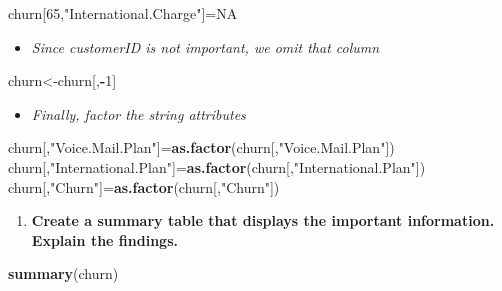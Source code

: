 \documentclass[]{article}
\newenvironment{Shaded}{\begin{snugshade}}{\end{snugshade}}
\newcommand{\DecValTok}[1]{\textcolor[rgb]{0.00,0.00,0.81}{#1}}
\newcommand{\KeywordTok}[1]{\textcolor[rgb]{0.13,0.29,0.53}{\textbf{#1}}}
\newcommand{\NormalTok}[1]{#1}
\newcommand{\OperatorTok}[1]{\textcolor[rgb]{0.81,0.36,0.00}{\textbf{#1}}}
\newcommand{\OtherTok}[1]{\textcolor[rgb]{0.56,0.35,0.01}{#1}}
\newcommand{\StringTok}[1]{\textcolor[rgb]{0.31,0.60,0.02}{#1}}
\providecommand{\tightlist}{%
  \setlength{\itemsep}{0pt}\setlength{\parskip}{0pt}}
\begin{document}
\begin{Shaded}
\begin{Highlighting}[]
\NormalTok{churn[}\DecValTok{65}\NormalTok{,}\StringTok{"International.Charge"}\NormalTok{]=}\OtherTok{NA}
\end{Highlighting}
\end{Shaded}

\begin{itemize}
\tightlist
\item
  \emph{Since customerID is not important, we omit that column}
\end{itemize}

\begin{Shaded}
\begin{Highlighting}[]
\NormalTok{churn<-churn[,}\OperatorTok{-}\DecValTok{1}\NormalTok{]}
\end{Highlighting}
\end{Shaded}

\begin{itemize}
\tightlist
\item
  \emph{Finally, factor the string attributes}
\end{itemize}

\begin{Shaded}
\begin{Highlighting}[]
\NormalTok{churn[,}\StringTok{"Voice.Mail.Plan"}\NormalTok{]=}\KeywordTok{as.factor}\NormalTok{(churn[,}\StringTok{"Voice.Mail.Plan"}\NormalTok{])}
\NormalTok{churn[,}\StringTok{"International.Plan"}\NormalTok{]=}\KeywordTok{as.factor}\NormalTok{(churn[,}\StringTok{"International.Plan"}\NormalTok{])}
\NormalTok{churn[,}\StringTok{"Churn"}\NormalTok{]=}\KeywordTok{as.factor}\NormalTok{(churn[,}\StringTok{"Churn"}\NormalTok{])}
\end{Highlighting}
\end{Shaded}

\begin{enumerate}
\def\labelenumi{\arabic{enumi}.}
\setcounter{enumi}{1}
\tightlist
\item
  \textbf{Create a summary table that displays the important
  information. Explain the findings.}
\end{enumerate}

\begin{Shaded}
\begin{Highlighting}[]
\KeywordTok{summary}\NormalTok{(churn)}
\end{Highlighting}
\end{Shaded}
\end{document}
